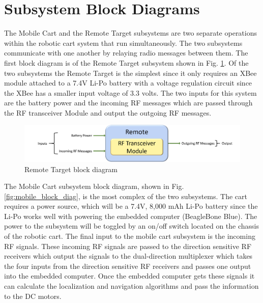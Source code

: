 \section{Subsystem Block Diagrams}
The Mobile Cart and the Remote Target subsystems are two separate operations within the robotic cart system that run simultaneously. The two subsystems communicate with one another by relaying radio messages between them. The first block diagram is of the Remote Target subsystem shown in Fig. \ref{fig:remote_block_diag}. Of the two subsystems the Remote Target is the simplest since it only requires an XBee module attached to a 7.4V Li-Po battery with a voltage regulation circuit since the XBee has a smaller input voltage of 3.3 volts. The two inputs for this system are the battery power and the incoming RF messages which are passed through the RF transceiver Module and output the outgoing RF messages.

\begin{figure}[h!]
  \centering
  \includegraphics[width=\textwidth]{figs/img/remoteBlockDiagram.png}
  \caption{Remote Target block diagram}
  \label{fig:remote_block_diag}
\end{figure}

\vspace*{12pt}
\noindent
The Mobile Cart subsystem block diagram, shown in Fig. \ref{fig:mobile_block_diag}, is the most complex of the two subsystems. The cart requires a power source, which will be a 7.4V, 8,000 mAh Li-Po battery since the Li-Po works well with powering the embedded computer (BeagleBone Blue). The power to the subsystem will be toggled by an on/off switch located on the chassis of the robotic cart. The final input to the mobile cart subsystem is the incoming RF signals. These incoming RF signals are passed to the direction sensitive RF receivers which output the signals to the dual-direction multiplexer which takes the four inputs from the direction sensitive RF receivers and passes one output into the embedded computer. Once the embedded computer gets these signals it can calculate the localization and navigation algorithms and pass the information to the DC motors.

